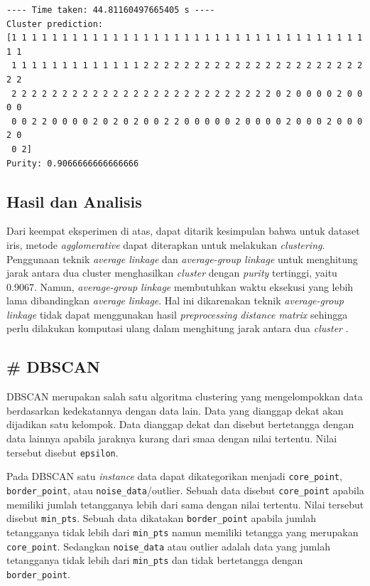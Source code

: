 \documentclass[11pt]{article}
\begin{document}
    \begin{Verbatim}[commandchars=\\\{\}]
---- Time taken: 44.81160497665405 s ----
Cluster prediction:
[1 1 1 1 1 1 1 1 1 1 1 1 1 1 1 1 1 1 1 1 1 1 1 1 1 1 1 1 1 1 1 1 1 1 1 1 1
 1 1 1 1 1 1 1 1 1 1 1 1 1 2 2 2 2 2 2 2 2 2 2 2 2 2 2 2 2 2 2 2 2 2 2 2 2
 2 2 2 2 2 2 2 2 2 2 2 2 2 2 2 2 2 2 2 2 2 2 2 2 2 2 0 2 0 0 0 0 2 0 0 0 0
 0 0 2 2 0 0 0 0 2 0 2 0 2 0 0 2 2 0 0 0 0 0 2 0 0 0 0 2 0 0 0 2 0 0 0 2 0
 0 2]
Purity: 0.9066666666666666

    \end{Verbatim}

    \subsection{Hasil dan Analisis}\label{hasil-dan-analisis}

Dari keempat eksperimen di atas, dapat ditarik kesimpulan bahwa untuk
dataset iris, metode \emph{agglomerative} dapat diterapkan untuk
melakukan \emph{clustering}. Penggunaan teknik \emph{average linkage}
dan \emph{average-group linkage} untuk menghitung jarak antara dua
cluster menghasilkan \emph{cluster} dengan \emph{purity} tertinggi,
yaitu 0.9067. Namun, \emph{average-group linkage} membutuhkan waktu
eksekusi yang lebih lama dibandingkan \emph{average linkage}. Hal ini
dikarenakan teknik \emph{average-group linkage} tidak dapat menggunakan
hasil \emph{preprocessing distance matrix} sehingga perlu dilakukan
komputasi ulang dalam menghitung jarak antara dua \emph{cluster} .

    \subsection{\# DBSCAN}\label{dbscan}

DBSCAN merupakan salah satu algoritma clustering yang mengelompokkan
data berdasarkan kedekatannya dengan data lain. Data yang dianggap dekat
akan dijadikan satu kelompok. Data dianggap dekat dan disebut
bertetangga dengan data lainnya apabila jaraknya kurang dari smaa dengan
nilai tertentu. Nilai tersebut disebut \texttt{epsilon}.

Pada DBSCAN satu \emph{instance} data dapat dikategorikan menjadi
\texttt{core\_point}, \texttt{border\_point}, atau
\texttt{noise\_data}/outlier. Sebuah data disebut \texttt{core\_point}
apabila memiliki jumlah tetangganya lebih dari sama dengan nilai
tertentu. Nilai tersebut disebut \texttt{min\_pts}. Sebuah data
dikatakan \texttt{border\_point} apabila jumlah tetangganya tidak lebih
dari \texttt{min\_pts} namun memiliki tetangga yang merupakan
\texttt{core\_point}. Sedangkan \texttt{noise\_data} atau outlier adalah
data yang jumlah tetangganya tidak lebih dari \texttt{min\_pts} dan
tidak bertetangga dengan \texttt{border\_point}.
\end{document}
